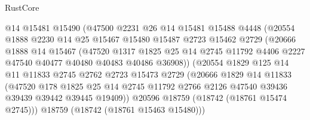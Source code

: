 \begin{lexlean}{RustCore}
\begin{coremodule}
                      @14
                      @15481
                      @15490
                      (@47500
                        @2231
                        @26
                        @14
                        @15481
                        @15488
                        @4448
                        (@20554
                          @1888
                          @2230
                          @14
                          @25
                          @15467
                          @15480
                          @15487
                          @2723
                          @15462
                          @2729
                          (@20666
                            @1888
                            @14
                            @15467
                            (@47520
                              @1317
                              @1825
                              @25
                              @14
                              @2745
                              @11792
                              @4406
                              @2227
                              @47540
                              @40477
                              @40480
                              @40483
                              @40486
                              @36908))
                          (@20554
                            @1829
                            @125
                            @14
                            @11
                            @11833
                            @2745
                            @2762
                            @2723
                            @15473
                            @2729
                            (@20666
                              @1829
                              @14
                              @11833
                              (@47520
                                @178
                                @1825
                                @25
                                @14
                                @2745
                                @11792
                                @2766
                                @2126
                                @47540
                                @39436
                                @39439
                                @39442
                                @39445
                                @19409))
                            @20596
                            @18759
                            (@18742 (@18761 @15474 @2745)))
                          @18759
                          (@18742 (@18761 @15463 @15480)))

\end{coremodule}
\end{lexlean}
